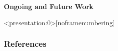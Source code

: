 \documentclass[aspectratio=169]{beamer}
\begin{document}
\begin{frame}{\huge{{\textbf{Ongoing and Future Work}}}}

    
  \end{frame}




\begin{frame}<presentation:0>[noframenumbering]

  {\cite{Lehner-2007} \cite{Richter-2006} \cite{savage-2014} \cite{danforth-2016} \cite{acharya_khaire}}
      
  \end{frame}
      
  
  
  \begin{frame}
  \renewcommand{\bibfont}{\footnotesize}
  \frametitle{\huge{\textbf{References}}}
  
  
  
  
  \end{frame}
  
  
  
  
\end{document}
